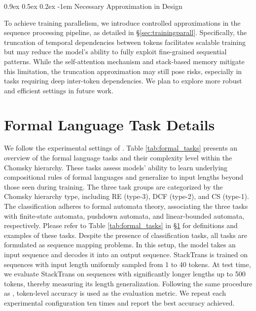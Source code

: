 \documentclass{article}
\makeatletter
\providecommand{\paragraph}{}
\renewcommand{\paragraph}[1]{%
  \@startsection{paragraph}{4}{\z@}%
                {0.9ex \@plus 0.5ex \@minus 0.2ex}%
                {-1em}%
                {\normalsize\bfseries}%
  {#1}
}
\DeclareRobustCommand{\method}{{\sc StackTrans}\xspace}
\makeatother
\begin{document}
\paragraph{Necessary Approximation in Design}  
To achieve training parallelism, we introduce controlled approximations in the sequence processing pipeline, as detailed in \S\ref{sec:trainingparall}. 
Specifically, the truncation of temporal dependencies between tokens facilitates scalable training but may reduce the model’s ability to fully exploit fine-grained sequential patterns. 
While the self-attention mechanism and stack-based memory mitigate this limitation, the truncation approximation may still pose risks, especially in tasks requiring deep inter-token dependencies. 
We plan to explore more robust and efficient settings in future work.

\section{Formal Language Task Details}
\label{appendix:formal}
We follow the experimental settings of \citet{deletang2022neural}. Table \ref{tab:formal_tasks} presents an overview of the formal language tasks and their complexity level within the Chomsky hierarchy.
These tasks assess models' ability to learn underlying compositional rules of formal languages and generalize to input lengths beyond those seen during training. 
The three task groups are categorized by the Chomsky hierarchy type, including RE (type-3), DCF (type-2), and CS (type-1). 
The classification adheres to formal automata theory, associating the three tasks with finite-state automata, pushdown automata, and linear-bounded automata, respectively. 
Please refer to Table \ref{tab:formal_tasks} in \S\ref{appendix:formal} for definitions and examples of these tasks.
Despite the presence of classification tasks, all tasks are formulated as sequence mapping problems. In this setup, the model takes an input sequence and decodes it into an output sequence.
\method is trained on sequences with input length uniformly sampled from 1 to 40 tokens.
At test time, we evaluate \method on sequences with significantly longer lengths up to 500 tokens, thereby measuring its length generalization. 
Following the same procedure as \cite{deletang2022neural}, token-level accuracy is used as the evaluation metric.
We repeat each experimental configuration ten times and report the best accuracy achieved.
\end{document}
